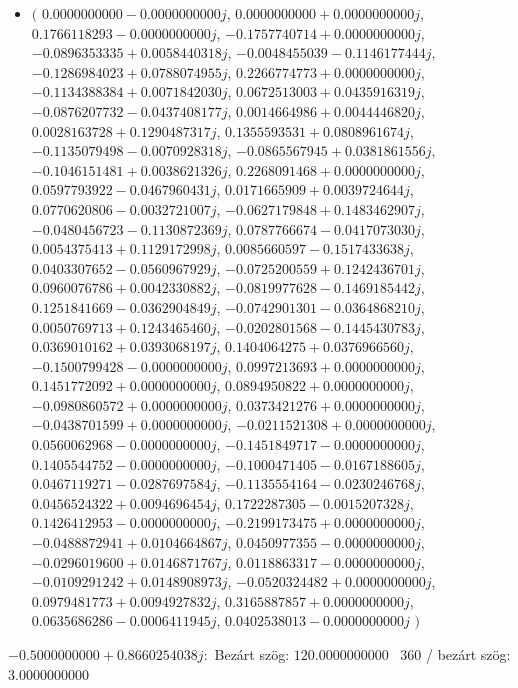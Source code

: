 \documentclass[14pt,a4paper]{article}
\begin{document}
\begin{itemize}
\item
$\big($
$0.0000000000-0.0000000000j$, $0.0000000000+0.0000000000j$, $0.1766118293-0.0000000000j$, $-0.1757740714+0.0000000000j$, $-0.0896353335+0.0058440318j$, $-0.0048455039-0.1146177444j$, $-0.1286984023+0.0788074955j$, $0.2266774773+0.0000000000j$, $-0.1134388384+0.0071842030j$, $0.0672513003+0.0435916319j$, $-0.0876207732-0.0437408177j$, $0.0014664986+0.0044446820j$, $0.0028163728+0.1290487317j$, $0.1355593531+0.0808961674j$, $-0.1135079498-0.0070928318j$, $-0.0865567945+0.0381861556j$, $-0.1046151481+0.0038621326j$, $0.2268091468+0.0000000000j$, $0.0597793922-0.0467960431j$, $0.0171665909+0.0039724644j$, $0.0770620806-0.0032721007j$, $-0.0627179848+0.1483462907j$, $-0.0480456723-0.1130872369j$, $0.0787766674-0.0417073030j$, $0.0054375413+0.1129172998j$, $0.0085660597-0.1517433638j$, $0.0403307652-0.0560967929j$, $-0.0725200559+0.1242436701j$, $0.0960076786+0.0042330882j$, $-0.0819977628-0.1469185442j$, $0.1251841669-0.0362904849j$, $-0.0742901301-0.0364868210j$, $0.0050769713+0.1243465460j$, $-0.0202801568-0.1445430783j$, $0.0369010162+0.0393068197j$, $0.1404064275+0.0376966560j$, $-0.1500799428-0.0000000000j$, $0.0997213693+0.0000000000j$, $0.1451772092+0.0000000000j$, $0.0894950822+0.0000000000j$, $-0.0980860572+0.0000000000j$, $0.0373421276+0.0000000000j$, $-0.0438701599+0.0000000000j$, $-0.0211521308+0.0000000000j$, $0.0560062968-0.0000000000j$, $-0.1451849717-0.0000000000j$, $0.1405544752-0.0000000000j$, $-0.1000471405-0.0167188605j$, $0.0467119271-0.0287697584j$, $-0.1135554164-0.0230246768j$, $0.0456524322+0.0094696454j$, $0.1722287305-0.0015207328j$, $0.1426412953-0.0000000000j$, $-0.2199173475+0.0000000000j$, $-0.0488872941+0.0104664867j$, $0.0450977355-0.0000000000j$, $-0.0296019600+0.0146871767j$, $0.0118863317-0.0000000000j$, $-0.0109291242+0.0148908973j$, $-0.0520324482+0.0000000000j$, $0.0979481773+0.0094927832j$, $0.3165887857+0.0000000000j$, $0.0635686286-0.0006411945j$, $0.0402538013-0.0000000000j$
$\big)$
\end{itemize}
$-0.5000000000+0.8660254038j$:\
Bezárt szög: $120.0000000000$ \
360 / bezárt szög: $3.0000000000$\
\end{document}
